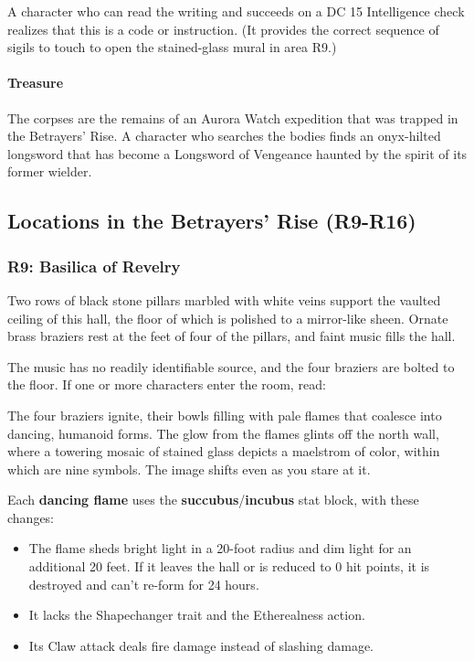 \documentclass[10pt,a4,twoside,twocolumn,openany,nodeprecatedcode]{dndbook}
\begin{document}
A character who can read the writing and succeeds on a DC 15 Intelligence check realizes that this is a code or instruction. (It provides the correct sequence of sigils to touch to open the stained-glass mural in area R9.)
\paragraph{Treasure}
The corpses are the remains of an Aurora Watch expedition that was trapped in the Betrayers' Rise. A character who searches the bodies finds an onyx-hilted longsword that has become a Longsword of Vengeance haunted by the spirit of its former wielder.
\subsection{Locations in the Betrayers' Rise (R9-R16)}
\subsubsection{R9: Basilica of Revelry}
\begin{DndReadAloud}{}
Two rows of black stone pillars marbled with white veins support the vaulted ceiling of this hall, the floor of which is polished to a mirror-like sheen. Ornate brass braziers rest at the feet of four of the pillars, and faint music fills the hall.
\end{DndReadAloud}

The music has no readily identifiable source, and the four braziers are bolted to the floor. If one or more characters enter the room, read:
\begin{DndReadAloud}{}
The four braziers ignite, their bowls filling with pale flames that coalesce into dancing, humanoid forms. The glow from the flames glints off the north wall, where a towering mosaic of stained glass depicts a maelstrom of color, within which are nine symbols. The image shifts even as you stare at it.
\end{DndReadAloud}

Each \textbf{dancing flame} uses the \textbf{succubus}/\textbf{incubus} stat block, with these changes:
\begin{itemize}

\item The flame sheds bright light in a 20-foot radius and dim light for an additional 20 feet. If it leaves the hall or is reduced to 0 hit points, it is destroyed and can't re-form for 24 hours.
\item It lacks the Shapechanger trait and the Etherealness action.
\item Its Claw attack deals fire damage instead of slashing damage.
\end{itemize}
\end{document}
